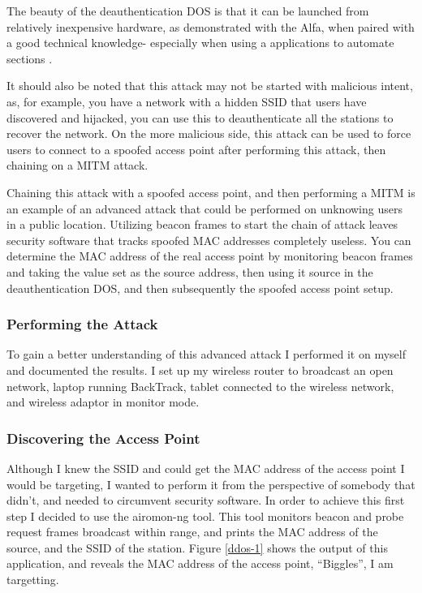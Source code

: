 The beauty of the deauthentication DOS is that it can be launched from relatively inexpensive hardware, as demonstrated with the Alfa, when paired with a good technical knowledge- especially when using a applications to automate sections \cite{research:aircrack}. 

It should also be noted that this attack may not be started with malicious intent, as, for example, you have a network with a hidden SSID that users have discovered and hijacked, you can use this to deauthenticate all the stations to recover the network. On the more malicious side, this attack can be used to force users to connect to a spoofed access point after performing this attack, then chaining on a MITM attack. 

Chaining this attack with a spoofed access point, and then performing a MITM is an example of an advanced attack that could be performed on unknowing users in a public location. Utilizing beacon frames to start the chain of attack leaves security software that tracks spoofed MAC addresses completely useless. You can determine the MAC address of the real access point by monitoring beacon frames and taking the value set as the source address, then using it source in the deauthentication DOS, and then subsequently the spoofed access point setup.

\subsubsection*{Performing the Attack}
To gain a better understanding of this advanced attack I performed it on myself and documented the results. I set up my wireless router to broadcast an open network, laptop running BackTrack, tablet connected to the wireless network, and wireless adaptor in monitor mode.

\subsubsection*{Discovering the Access Point}
Although I knew the SSID and could get the MAC address of the access point I would be targeting, I wanted to perform it from the perspective of somebody that didn't, and needed to circumvent security software. In order to achieve this first step I decided to use the airomon-ng tool. This tool monitors beacon and probe request frames broadcast within range, and prints the MAC address of the source, and the SSID of the station. Figure \ref{ddos-1} shows the output of this application, and reveals the MAC address of the access point, ``Biggles'', I am targetting.

